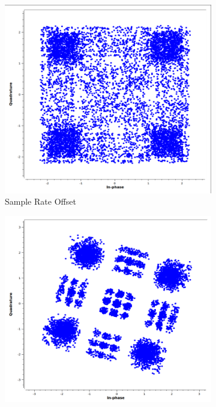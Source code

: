 \documentclass{article}
\begin{document}
\begin{figure}
    \centering
    \begin{subfigure}[b]{0.45\textwidth}
        \centering
        \includegraphics[width=\textwidth]{sro.png}
        \caption[]%
        {{\small Sample Rate Offset}}    
        \label{fig:sro}
    \end{subfigure}
    \hfill
    \begin{subfigure}[b]{0.45\textwidth}  
        \centering 
        \includegraphics[width=\textwidth]{cfo.png}

\end{subfigure}
\end{figure}
\end{document}
